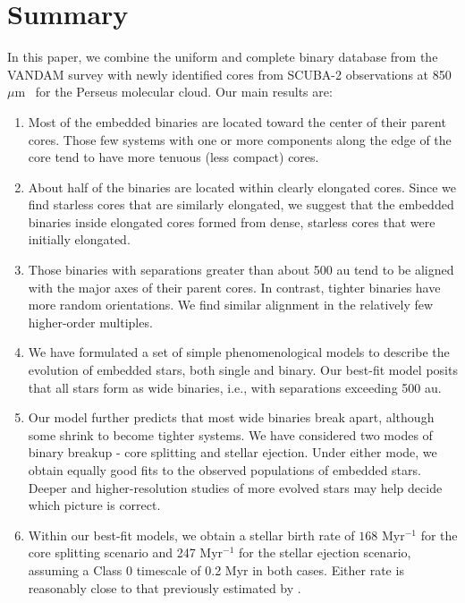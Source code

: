 \documentclass[usenatbib,a4paper]{mnras}
\newcommand{\um}{\mbox{$\mu$m}}%
\begin{document}
\section{Summary}\label{summary}

In this paper, we combine the uniform and complete binary database from the VANDAM survey \citep{Tobin16} with newly identified cores from SCUBA-2 observations at 850 \um\ \citep{MChen16} for the Perseus molecular cloud.  Our main results are:

\begin{enumerate}[label={(\arabic*)}, leftmargin=*]
\item Most of the embedded binaries are located toward the center of their parent cores.  Those few systems with one or more components along the edge of the core tend to have more tenuous (less compact) cores.\\[-2mm]
\item About half of the binaries are located within clearly elongated cores.  Since we find starless cores that are similarly elongated, we suggest that the embedded binaries inside elongated cores formed from dense, starless cores that were initially elongated.\\[-2mm]
\item Those binaries with separations greater than about 500 au tend to be aligned with the major axes of their parent cores.  In contrast, tighter binaries have more random orientations.   We find similar alignment in the relatively few higher-order multiples.\\[-2mm]
\item We have formulated a set of simple phenomenological models to describe the evolution of embedded stars, both single and binary.  Our best-fit model posits that all stars form as wide binaries, i.e., with separations exceeding 500 au. \\[-2mm]
\item Our model further predicts that most wide binaries break apart, although some shrink to become tighter systems.  We have considered two modes of binary breakup - core splitting and stellar ejection.  Under either mode, we obtain equally good fits to the observed populations of embedded stars.  Deeper and higher-resolution studies of more evolved stars may help decide which picture is correct.  \\[-2mm]
\item Within our best-fit models, we obtain a stellar birth rate of $168$ Myr$^{-1}$ for the core splitting scenario and 247 Myr$^{-1}$ for the stellar ejection scenario, assuming a Class 0 timescale of 0.2 Myr in both cases.  Either rate is reasonably close to that previously estimated by \citet{Evans09}.  \\[-2mm] 
\end{enumerate}
\end{document}
